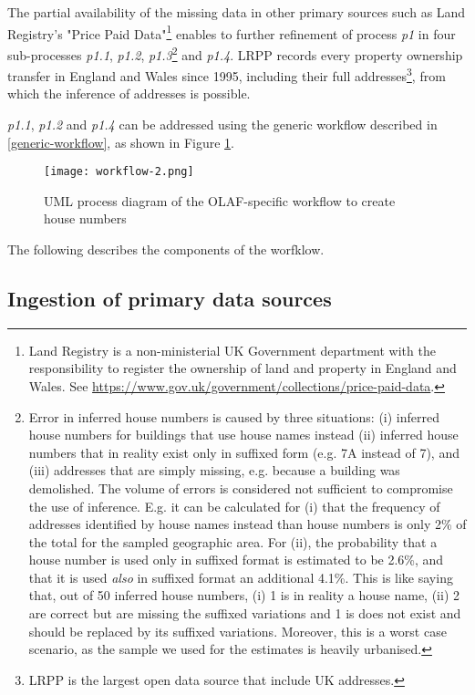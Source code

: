 The partial availability of the missing data in other primary sources such as Land Registry's "Price Paid Data"\footnote{Land Registry is a non-ministerial UK Government department with the responsibility to register the ownership of land and property in England and Wales. See \url{https://www.gov.uk/government/collections/price-paid-data}.} enables to further refinement of process {\it p1} in four sub-processes {\it p1.1}, {\it p1.2}, {\it p1.3}\footnote{Error in inferred house numbers is caused by three situations: (i) inferred house numbers for buildings that use house names instead (ii) inferred house numbers that in reality exist only in suffixed form (e.g. 7A instead of 7), and (iii) addresses that are simply missing, e.g. because a building was demolished. The volume of errors is considered not sufficient to compromise the use of inference. E.g. it can be calculated for (i) that the frequency of addresses identified by house names instead than house numbers is only 2\% of the total for the sampled geographic area. For (ii), the probability that a house number is used only in suffixed format is estimated to be 2.6\%, and that it is used {\it also} in suffixed format an additional 4.1\%. This is like saying that, out of 50 inferred house numbers, (i) 1 is in reality a house name, (ii) 2 are correct but are missing the suffixed variations and 1 is does not exist and should be replaced by its suffixed variations. Moreover, this is a worst case scenario, as the sample we used for the estimates is heavily urbanised.} and {\it p1.4}. LRPP records every property ownership transfer in England and Wales since 1995, including their full addresses\footnote{LRPP is the largest open data source that include UK addresses.}, from which the inference of addresses is possible.

{\it p1.1}, {\it p1.2} and {\it p1.4} can be addressed using the generic workflow described in \ref{generic-workflow}, as shown in Figure \ref{fig:workflow_2}.

\begin{figure}
	\texttt{[image: workflow-2.png]}
	\caption{UML process diagram of the OLAF-specific workflow to create house numbers}
	\label{fig:workflow_2}
\end{figure}

The following describes the components of the worfklow.

\subsection{Ingestion of primary data sources} 

